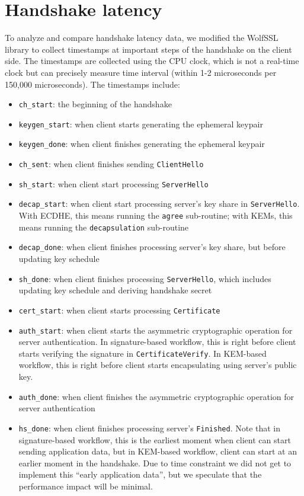 \documentclass[letterpaper,12pt,titlepage,oneside,final]{book}
\begin{document}
\section{Handshake latency}\label{sec:handshake-performance}
To analyze and compare handshake latency data, we modified the WolfSSL library to collect timestamps at important steps of the handshake on the client side.
The timestamps are collected using the CPU clock, which is not a real-time clock but can precisely measure time interval (within 1-2 microseconds per 150,000 microseconds).
The timestamps include: \begin{itemize}
    \item \texttt{ch\_start}: the beginning of the handshake
    \item \texttt{keygen\_start}: when client starts generating the ephemeral keypair
    \item \texttt{keygen\_done}: when client finishes generating the ephemeral keypair
    \item \texttt{ch\_sent}: when client finishes sending \texttt{ClientHello}
    \item \texttt{sh\_start}: when client start processing \texttt{ServerHello}
    \item \texttt{decap\_start}: when client start processing server's key share in \texttt{ServerHello}. With ECDHE, this means running the \texttt{agree} sub-routine; with KEMs, this means running the \texttt{decapsulation} sub-routine
    \item \texttt{decap\_done}: when client finishes processing server's key share, but before updating key schedule
    \item \texttt{sh\_done}: when client finishes processing \texttt{ServerHello}, which includes updating key schedule and deriving handshake secret
    \item \texttt{cert\_start}: when client starts processing \texttt{Certificate}
    \item \texttt{auth\_start}: when client starts the asymmetric cryptographic operation for server authentication. In signature-based workflow, this is right before client starts verifying the signature in \texttt{CertificateVerify}. In KEM-based workflow, this is right before client starts encapsulating using server's public key.
    \item \texttt{auth\_done}: when client finishes the asymmetric cryptographic operation for server authentication
    \item \texttt{hs\_done}: when client finishes processing server's \texttt{Finished}. Note that in signature-based workflow, this is the earliest moment when client can start sending application data, but in KEM-based workflow, client can start at an earlier moment in the handshake. Due to time constraint we did not get to implement this ``early application data'', but we speculate that the performance impact will be minimal.
\end{itemize}
\end{document}
